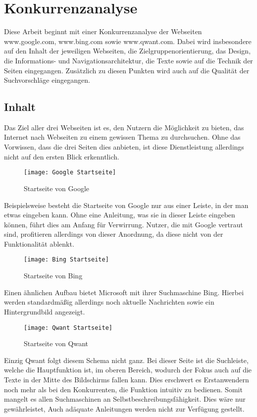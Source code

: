 \section{Konkurrenzanalyse}\label{sec:konkurrenzanalyse}
Diese Arbeit beginnt mit einer Konkurrenzanalyse der Webseiten www.google.com, www.bing.com sowie www.qwant.com.
Dabei wird insbesondere auf den Inhalt der jeweiligen Webseiten, die Zielgruppenorientierung, das Design, die Informations-
und Navigationsarchitektur, die Texte sowie auf die Technik der Seiten eingegangen.
Zusätzlich zu diesen Punkten wird auch auf die Qualität der Suchvorschläge eingegangen.

\subsection{Inhalt}\label{subsec:inhalt}
Das Ziel aller drei Webseiten ist es, den Nutzern die Möglichkeit zu bieten, das Internet nach Webseiten zu einem gewissen
Thema zu durchsuchen.
Ohne das Vorwissen, dass die drei Seiten dies anbieten, ist diese Dienstleistung allerdings nicht auf den ersten
Blick erkenntlich.
\begin{figure}[ht]
    \centering
    \texttt{[image: Google Startseite]}
    \caption{Startseite von Google}\label{fig:figure}
\end{figure}

Beispielsweise besteht die Startseite von Google nur aus einer Leiste, in der man etwas eingeben kann.
Ohne eine Anleitung, was sie in dieser Leiste eingeben können, führt dies am Anfang für Verwirrung.
Nutzer, die mit Google vertraut sind, profitieren allerdings von dieser Anordnung, da diese nicht von der Funktionalität ablenkt.
\begin{figure}[ht]
    \centering
    \texttt{[image: Bing Startseite]}
    \caption{Startseite von Bing}\label{fig:figure2}
\end{figure}
Einen ähnlichen
Aufbau bietet Microsoft mit ihrer Suchmaschine Bing.
Hierbei werden standardmäßig allerdings noch aktuelle Nachrichten sowie ein Hintergrundbild angezeigt.
\begin{figure}[ht]
    \centering
    \texttt{[image: Qwant Startseite]}
    \caption{Startseite von Qwant}\label{fig:figure3}
\end{figure}
Einzig Qwant folgt diesem Schema nicht ganz.
Bei dieser Seite ist die Suchleiste, welche die
Hauptfunktion ist, im oberen Bereich, wodurch der Fokus auch auf die Texte in der Mitte des Bildschirms fallen kann.
Dies erschwert es Erstanwendern noch mehr als bei den Konkurrenten, die Funktion intuitiv zu bedienen.
Somit mangelt es allen Suchmaschinen an Selbstbeschreibungsfähigkeit.
Dies wäre nur gewährleistet, \autocite[Seite 6]{Maulhardt.20220506}
Auch adäquate Anleitungen werden nicht zur Verfügung gestellt.

